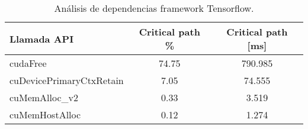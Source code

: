 \begin{table}[]
\centering
\caption{Análisis de dependencias framework Tensorflow.}
\begin{tabular}{lcc}
\toprule
Llamada API              & Critical path \% & Critical path {[}ms{]} \\
\midrule
cudaFree                 & 74.75            & 790.985            \\
cuDevicePrimaryCtxRetain & 7.05             & 74.555             \\
cuMemAlloc\_v2           & 0.33             & 3.519               \\
cuMemHostAlloc           & 0.12             & 1.274              \\
\bottomrule
\end{tabular}
\label{api-tensorflow}
\end{table}